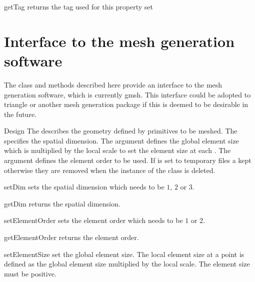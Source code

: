 \begin{methoddesc}[PropertySet]{getTag}{}
returns the tag used for this property set
\end{methoddesc}

\section{Interface to the mesh generation software}

The class and methods described here provide an interface to the mesh
generation software, which is currently gmsh.  This interface could be
adopted to triangle or another mesh generation package if this is
deemed to be desirable in the future.

\begin{classdesc}{Design}{
}
The  describes the geometry defined by primitives to be meshed.
The  specifies the spatial dimension. The argument  defines the global
element size which is multiplied by the local scale to set the element size at each \Point. 
The argument  defines the element order to be used. If  is set to 
\True temporary files a kept otherwise they are removed when the instance of the class is deleted. 
\end{classdesc}


\begin{methoddesc}[Design]{setDim}{}
sets the spatial dimension which needs to be $1$, $2$ or $3$.
\end{methoddesc}

\begin{methoddesc}[Design]{getDim}{}
returns the spatial dimension.
\end{methoddesc}

\begin{methoddesc}[Design]{setElementOrder}{}
sets the element order which needs to be $1$ or $2$.
\end{methoddesc}

\begin{methoddesc}[Design]{getElementOrder}{}
returns the element order.
\end{methoddesc}


\begin{methoddesc}[Design]{setElementSize}{}
set the global element size. The local element size at a point is defined as 
the global element size multiplied by the local scale. The element size must be positive.
\end{methoddesc}


